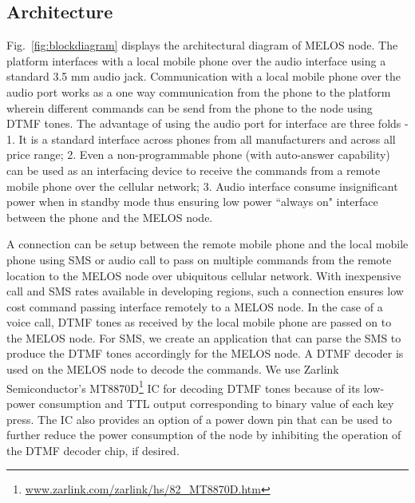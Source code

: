 \documentclass[10pt]{sigplan-proc-varsize}
\newcommand{\figref}[1]{Fig.~\ref{#1}}
\newcommand{\melos}{MELOS }
\begin{document}
\subsection{Architecture}
\figref{fig:blockdiagram} displays the architectural diagram of \melos node. The platform interfaces with a local mobile phone over the audio interface using a standard 3.5 mm audio jack. Communication with a local mobile phone over the audio port works as a one way communication from the phone to the platform wherein different commands can be send from the phone to the node using DTMF tones. The advantage of using the audio port for interface are three folds - 1. It is a standard interface across phones from all manufacturers and across all price range; 2. Even a non-programmable phone (with auto-answer capability) can be used as an interfacing device to receive the commands from a remote mobile phone over the cellular network; 3. Audio interface consume insignificant power when in standby mode thus ensuring low power ``always on" interface between the phone and the \melos node. 

A connection can be setup between the remote mobile phone and the local mobile phone using SMS or audio call to pass on multiple commands from the remote location to the \melos node over ubiquitous cellular network. With inexpensive call and SMS rates available in developing regions, such a connection ensures low cost command passing interface remotely to a \melos node. In the case of a voice call, DTMF tones as received by the local mobile phone are passed on to the \melos node. For SMS, we create an application that can parse the SMS to produce the DTMF tones accordingly for the \melos node. A DTMF decoder is used on the \melos node to decode the commands. We use Zarlink Semiconductor's MT8870D\footnote{\url{www.zarlink.com/zarlink/hs/82_MT8870D.htm}} IC for decoding DTMF tones because of its low-power consumption and TTL output corresponding to binary value of each key press. The IC also provides an option of a power down pin that can be used to further reduce the power consumption of the node by inhibiting the operation of the DTMF decoder chip, if desired.
\end{document}
